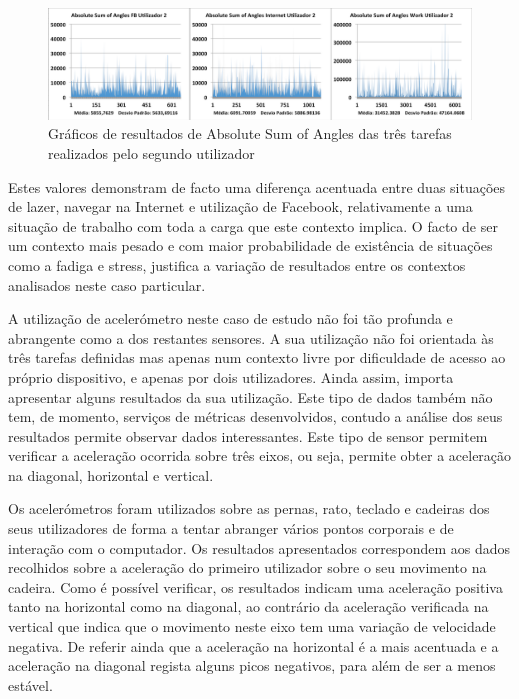  \begin{figure}[htb]
   \centering
   \includegraphics[scale=0.35]{Images/sumofangles1.png}
   \caption{Gráficos de resultados de Absolute Sum of Angles das três tarefas realizados pelo segundo utilizador}
\end{figure}

Estes valores demonstram de facto uma diferença acentuada entre duas situações de lazer, navegar na Internet e utilização de Facebook, relativamente a uma situação de trabalho com toda a carga que este contexto implica. O facto de ser um contexto mais pesado e com maior probabilidade de existência de situações como a fadiga e stress, justifica a variação de resultados entre os contextos analisados neste caso particular.


A utilização de acelerómetro neste caso de estudo não foi tão profunda e abrangente como a dos restantes sensores. A sua utilização não foi orientada às três tarefas definidas mas apenas num contexto livre por dificuldade de acesso ao próprio dispositivo, e apenas por dois utilizadores. Ainda assim, importa apresentar alguns resultados da sua utilização. Este tipo de dados também não tem, de momento, serviços de métricas desenvolvidos, contudo a análise dos seus resultados permite observar dados interessantes. Este tipo de sensor permitem verificar a aceleração ocorrida sobre três eixos, ou seja, permite obter a aceleração na diagonal, horizontal e vertical.

Os acelerómetros foram utilizados sobre as pernas, rato, teclado e cadeiras dos seus utilizadores de forma a tentar abranger vários pontos corporais e de interação com o computador. Os resultados apresentados correspondem aos dados recolhidos sobre a aceleração do primeiro utilizador sobre o seu movimento na cadeira. Como é possível verificar, os resultados indicam uma aceleração positiva tanto na horizontal como na diagonal, ao contrário da aceleração verificada na vertical que indica que o movimento neste eixo tem uma variação de velocidade negativa. De referir ainda que a aceleração na horizontal é a mais acentuada e a aceleração na diagonal regista alguns picos negativos, para além de ser a menos estável.

